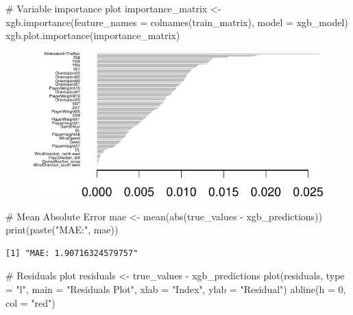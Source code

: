 \documentclass[
  super,
  preprint,
  3p]{elsarticle}
\newenvironment{Shaded}{\begin{snugshade}}{\end{snugshade}}
\newcommand{\AttributeTok}[1]{\textcolor[rgb]{0.40,0.45,0.13}{#1}}
\newcommand{\CommentTok}[1]{\textcolor[rgb]{0.37,0.37,0.37}{#1}}
\newcommand{\DecValTok}[1]{\textcolor[rgb]{0.68,0.00,0.00}{#1}}
\newcommand{\FunctionTok}[1]{\textcolor[rgb]{0.28,0.35,0.67}{#1}}
\newcommand{\NormalTok}[1]{\textcolor[rgb]{0.00,0.23,0.31}{#1}}
\newcommand{\OtherTok}[1]{\textcolor[rgb]{0.00,0.23,0.31}{#1}}
\newcommand{\SpecialCharTok}[1]{\textcolor[rgb]{0.37,0.37,0.37}{#1}}
\newcommand{\StringTok}[1]{\textcolor[rgb]{0.13,0.47,0.30}{#1}}
\begin{document}
\begin{Shaded}
\begin{Highlighting}[]
\CommentTok{\# Variable importance plot}
\NormalTok{importance\_matrix }\OtherTok{\textless{}{-}} \FunctionTok{xgb.importance}\NormalTok{(}\AttributeTok{feature\_names =} \FunctionTok{colnames}\NormalTok{(train\_matrix), }\AttributeTok{model =}\NormalTok{ xgb\_model)}
\FunctionTok{xgb.plot.importance}\NormalTok{(importance\_matrix)}
\end{Highlighting}
\end{Shaded}

\begin{figure}[H]

{\centering \includegraphics{project_report_files/figure-pdf/unnamed-chunk-20-1.pdf}

}

\end{figure}

\begin{Shaded}
\begin{Highlighting}[]
\CommentTok{\# Mean Absolute Error}
\NormalTok{mae }\OtherTok{\textless{}{-}} \FunctionTok{mean}\NormalTok{(}\FunctionTok{abs}\NormalTok{(true\_values }\SpecialCharTok{{-}}\NormalTok{ xgb\_predictions))}
\FunctionTok{print}\NormalTok{(}\FunctionTok{paste}\NormalTok{(}\StringTok{"MAE:"}\NormalTok{, mae))}
\end{Highlighting}
\end{Shaded}

\begin{verbatim}
[1] "MAE: 1.90716324579757"
\end{verbatim}

\begin{Shaded}
\begin{Highlighting}[]
\CommentTok{\# Residuals plot}
\NormalTok{residuals }\OtherTok{\textless{}{-}}\NormalTok{ true\_values }\SpecialCharTok{{-}}\NormalTok{ xgb\_predictions}
\FunctionTok{plot}\NormalTok{(residuals, }\AttributeTok{type =} \StringTok{"l"}\NormalTok{, }\AttributeTok{main =} \StringTok{"Residuals Plot"}\NormalTok{, }\AttributeTok{xlab =} \StringTok{"Index"}\NormalTok{, }\AttributeTok{ylab =} \StringTok{"Residual"}\NormalTok{)}
\FunctionTok{abline}\NormalTok{(}\AttributeTok{h =} \DecValTok{0}\NormalTok{, }\AttributeTok{col =} \StringTok{"red"}\NormalTok{)}
\end{Highlighting}
\end{Shaded}
\end{document}
